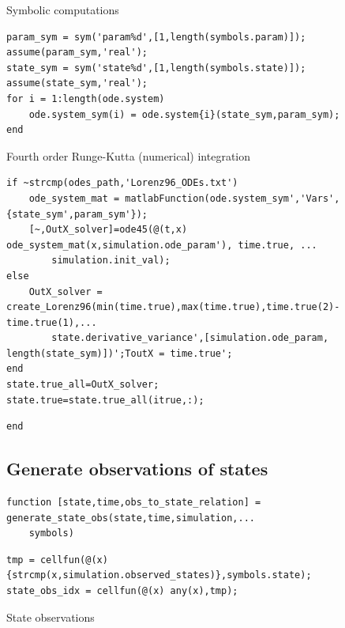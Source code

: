 \color{black}
\begin{par}
Symbolic computations
\end{par} \vspace{1em}
\color{RoyalPurple}\begin{verbatim}
param_sym = sym('param%d',[1,length(symbols.param)]); assume(param_sym,'real');
state_sym = sym('state%d',[1,length(symbols.state)]); assume(state_sym,'real');
for i = 1:length(ode.system)
    ode.system_sym(i) = ode.system{i}(state_sym,param_sym);
end
\end{verbatim}
\color{black}
\begin{par}
Fourth order Runge-Kutta (numerical) integration
\end{par} \vspace{1em}
\color{RoyalPurple}\begin{verbatim}
if ~strcmp(odes_path,'Lorenz96_ODEs.txt')
    ode_system_mat = matlabFunction(ode.system_sym','Vars',{state_sym',param_sym'});
    [~,OutX_solver]=ode45(@(t,x) ode_system_mat(x,simulation.ode_param'), time.true, ...
        simulation.init_val);
else
    OutX_solver = create_Lorenz96(min(time.true),max(time.true),time.true(2)-time.true(1),...
        state.derivative_variance',[simulation.ode_param, length(state_sym)])';ToutX = time.true';
end
state.true_all=OutX_solver;
state.true=state.true_all(itrue,:);
\end{verbatim}
\color{black}
\color{RoyalPurple}\begin{verbatim}
end
\end{verbatim}
\color{black}
\begin{par}
\section{ Generate observations of states }
\end{par} \vspace{1em}
\color{RoyalPurple}\begin{verbatim}
function [state,time,obs_to_state_relation] = generate_state_obs(state,time,simulation,...
    symbols)
\end{verbatim}
\color{black}
\color{RoyalPurple}\begin{verbatim}
tmp = cellfun(@(x) {strcmp(x,simulation.observed_states)},symbols.state);
state_obs_idx = cellfun(@(x) any(x),tmp);
\end{verbatim}
\color{black}
\begin{par}
State observations
\end{par} \vspace{1em}
